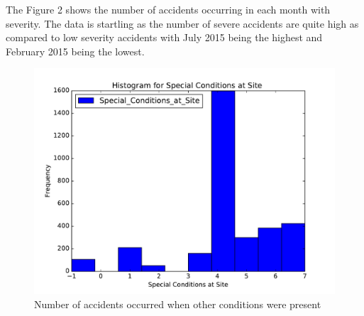\documentclass{acm_proc_article-sp}
\begin{document}
The Figure 2 shows the number of accidents occurring in each month with severity. The data is startling as the number of severe accidents are quite high as compared to low severity accidents with July 2015 being the highest and February 2015 being the lowest.
\\

\begin{figure}
  \centering
      \includegraphics[width=1.0\columnwidth]{images/histogram-othconditions.pdf}
  \caption{Number of accidents occurred when other conditions were present}
\end{figure}
\end{document}
